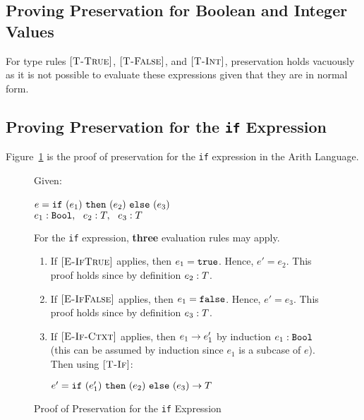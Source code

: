 \documentclass{report}
\newcommand{\rel}[1]{ \mbox{\sc [#1]} }
\begin{document}
\subsection{Proving Preservation for Boolean and Integer Values}

For type rules $\rel{T-True}$, $\rel{T-False}$, and $\rel{T-Int}$, preservation holds vacuously as it is not possible to evaluate these expressions given that they are in normal form.

\subsection{Proving Preservation for the \texttt{if} Expression}

Figure~\ref{fig:ifProofPreservation} is the proof of preservation for the \texttt{if} expression in the Arith Language.

\begin{figure}[ht!]
Given:
\begin{center}
   $e = \mbox{\tt if}~({e_1})~\mbox{\tt then}~({e_2})~\mbox{\tt else}~({e_3})$~\\
   ${e_1} : {\mbox{\tt Bool}},~~{e_2} : {T},~~{e_3} : {T}$
\end{center}
For the \texttt{if} expression, \textbf{three} evaluation rules may apply.
\begin{enumerate}

    \item If $\rel{E-IfTrue}$ applies, then $e_1 = \mbox{\tt true}$.  Hence, $e' = e_2$.  This proof holds since by definition ${e_2} : {T}$.
      
    \item If $\rel{E-IfFalse}$ applies, then $e_1 = \mbox{\tt false}$.  Hence, $e' = e_3$.  This proof holds since by definition ${e_3} : {T}$.
    
    \item If $\rel{E-If-Ctxt}$ applies, then ${e_1} \rightarrow {e'_1}$ by induction ${e_1} : {\mbox{\tt Bool}}$ (this can be assumed by induction since $e_1$ is a subcase of $e$).  Then using $\rel{T-If}$:
    
    \begin{center}
      ${e' = \mbox{\tt if}~({e'_1})~\mbox{\tt then}~({e_2})~\mbox{\tt else}~({e_3})} \rightarrow {T}$
    \end{center}
	
	\end{enumerate}
	
  \caption{Proof of Preservation for the \texttt{if} Expression}\label{fig:ifProofPreservation}
\end{figure} 
\end{document}
